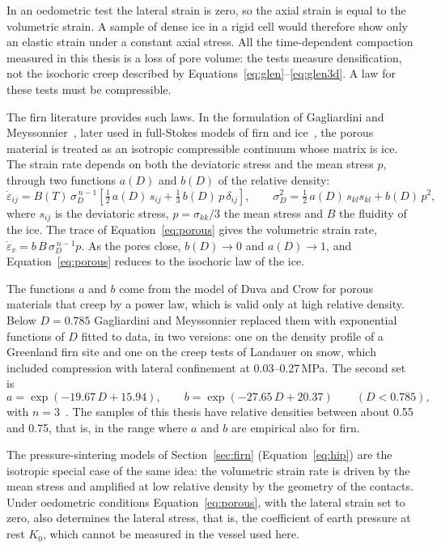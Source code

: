 In an oedometric test the lateral strain is zero, so the axial strain is equal to the volumetric strain. A sample of dense ice in a rigid cell would therefore show only an elastic strain under a constant axial stress. All the time-dependent compaction measured in this thesis is a loss of pore volume: the tests measure densification, not the isochoric creep described by Equations~\eqref{eq:glen}--\eqref{eq:glen3d}. A law for these tests must be compressible.

The firn literature provides such laws. In the formulation of Gagliardini and Meyssonnier~\cite{gagliardini1997}, later used in full-Stokes models of firn and ice~\cite{zwinger2007}, the porous material is treated as an isotropic compressible continuum whose matrix is ice. The strain rate depends on both the deviatoric stress and the mean stress $p$, through two functions $a(D)$ and $b(D)$ of the relative density:
\begin{equation}
    \dot\varepsilon_{ij} = B(T)\,\sigma_D^{\,n-1}\left[\tfrac{1}{2}\,a(D)\,s_{ij} + \tfrac{1}{3}\,b(D)\,p\,\delta_{ij}\right], \qquad \sigma_D^{2} = \tfrac{1}{2}\,a(D)\,s_{kl}s_{kl} + b(D)\,p^{2},
    \label{eq:porous}
\end{equation}
where $s_{ij}$ is the deviatoric stress, $p = \sigma_{kk}/3$ the mean stress and $B$ the fluidity of the ice. The trace of Equation~\eqref{eq:porous} gives the volumetric strain rate, $\dot\varepsilon_{v} = b\,B\,\sigma_D^{\,n-1}p$. As the pores close, $b(D)\to0$ and $a(D)\to1$, and Equation~\eqref{eq:porous} reduces to the isochoric law of the ice.

The functions $a$ and $b$ come from the model of Duva and Crow for porous materials that creep by a power law, which is valid only at high relative density. Below $D = 0.785$ Gagliardini and Meyssonnier replaced them with exponential functions of $D$ fitted to data, in two versions: one on the density profile of a Greenland firn site and one on the creep tests of Landauer on snow, which included compression with lateral confinement at 0.03--0.27\,MPa. The second set is
\begin{equation}
    a = \exp(-19.67\,D + 15.94), \qquad b = \exp(-27.65\,D + 20.37) \qquad (D < 0.785),
    \label{eq:ab_gm}
\end{equation}
with $n = 3$~\cite{gagliardini1997}. The samples of this thesis have relative densities between about 0.55 and 0.75, that is, in the range where $a$ and $b$ are empirical also for firn.

The pressure-sintering models of Section~\ref{sec:firn} (Equation~\eqref{eq:hip}) are the isotropic special case of the same idea: the volumetric strain rate is driven by the mean stress and amplified at low relative density by the geometry of the contacts. Under oedometric conditions Equation~\eqref{eq:porous}, with the lateral strain set to zero, also determines the lateral stress, that is, the coefficient of earth pressure at rest $K_0$, which cannot be measured in the vessel used here.

